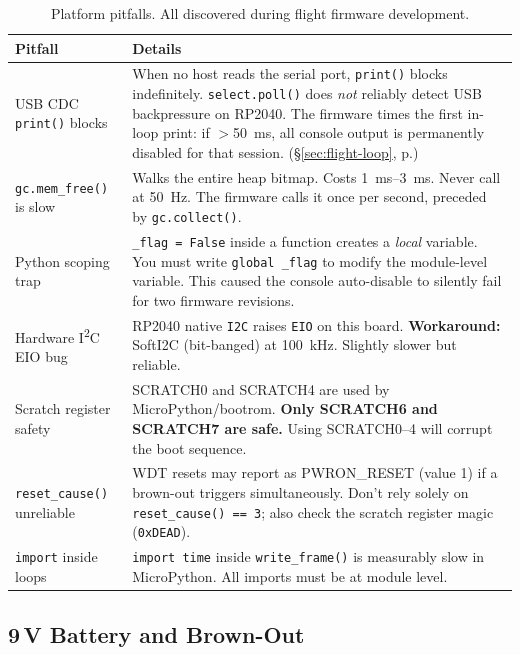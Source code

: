 \documentclass[11pt, a4paper, twoside]{article}
\newcommand{\hex}[1]{\texttt{0x#1}}
\newcommand{\xref}[1]{(\S\ref{#1}, p.\pageref{#1})}
\begin{document}
\begin{table}[ht]
\centering
\small
\caption{Platform pitfalls. All discovered during flight firmware development.}
\label{tab:pitfalls}
\begin{tabularx}{\textwidth}{l X}
\toprule
\textbf{Pitfall} & \textbf{Details} \\
\midrule
USB CDC \texttt{print()} blocks & When no host reads the serial port, \texttt{print()} blocks indefinitely. \texttt{select.poll()} does \textit{not} reliably detect USB backpressure on RP2040. The firmware times the first in-loop print: if $>$\SI{50}{\milli\second}, all console output is permanently disabled for that session. \xref{sec:flight-loop} \\
\midrule
\texttt{gc.mem\_free()} is slow & Walks the entire heap bitmap. Costs \SI{1}{\milli\second}--\SI{3}{\milli\second}. Never call at \SI{50}{\hertz}. The firmware calls it once per second, preceded by \texttt{gc.collect()}. \\
\midrule
Python scoping trap & \texttt{\_flag = False} inside a function creates a \textit{local} variable. You must write \texttt{global \_flag} to modify the module-level variable. This caused the console auto-disable to silently fail for two firmware revisions. \\
\midrule
Hardware I\textsuperscript{2}C EIO bug & RP2040 native \texttt{I2C} raises \texttt{EIO} on this board. \textbf{Workaround:} SoftI2C (bit-banged) at \SI{100}{\kilo\hertz}. Slightly slower but reliable. \\
\midrule
Scratch register safety & SCRATCH0 and SCRATCH4 are used by MicroPython/bootrom. \textbf{Only SCRATCH6 and SCRATCH7 are safe.} Using SCRATCH0--4 will corrupt the boot sequence. \\
\midrule
\texttt{reset\_cause()} unreliable & WDT resets may report as PWRON\_RESET (value 1) if a brown-out triggers simultaneously. Don't rely solely on \texttt{reset\_cause() == 3}; also check the scratch register magic (\hex{DEAD}). \\
\midrule
\texttt{import} inside loops & \texttt{import time} inside \texttt{write\_frame()} is measurably slow in MicroPython. All imports must be at module level. \\
\bottomrule
\end{tabularx}
\end{table}

\subsection{9\,V Battery and Brown-Out}
\label{sec:battery}
\end{document}
